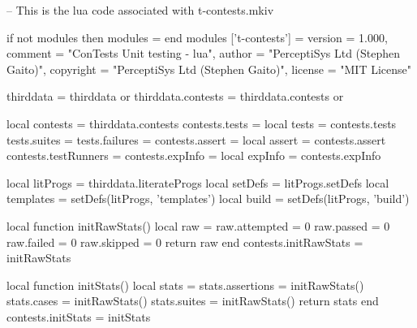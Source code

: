 
\startchapter[title=Preamble]

\startMkIVCode

%
%
\stopMkIVCode

\startMkIVCode
{}

\unprotect

\stopMkIVCode

\startLuaCode
-- This is the lua code associated with t-contests.mkiv

if not modules then modules = { } end modules ['t-contests'] = {
    version   = 1.000,
    comment   = "ConTests Unit testing - lua",
    author    = "PerceptiSys Ltd (Stephen Gaito)",
    copyright = "PerceptiSys Ltd (Stephen Gaito)",
    license   = "MIT License"
}

thirddata            = thirddata          or {}
thirddata.contests   = thirddata.contests or {}

local contests       = thirddata.contests
contests.tests       = {}
local tests          = contests.tests
tests.suites         = {}
tests.failures       = {}
contests.assert      = {}
local assert         = contests.assert
contests.testRunners = {}
contests.expInfo     = {}
local expInfo        = contests.expInfo

local litProgs       = thirddata.literateProgs
local setDefs        = litProgs.setDefs
local templates      = setDefs(litProgs, 'templates')
local build          = setDefs(litProgs, 'build')

local function initRawStats()
  local raw = {}
  raw.attempted  = 0
  raw.passed     = 0
  raw.failed     = 0
  raw.skipped    = 0
  return raw
end
contests.initRawStats = initRawStats

local function initStats()
  local stats = {}
  stats.assertions = initRawStats()
  stats.cases      = initRawStats()
  stats.suites     = initRawStats()
  return stats
end
contests.initStats = initStats

